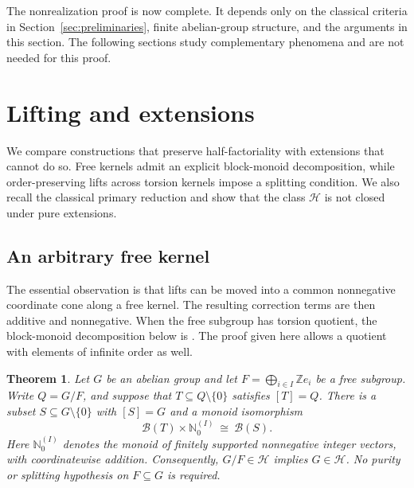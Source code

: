 \documentclass[11pt,reqno]{amsart}
\numberwithin{equation}{section}
\newtheorem{theorem}{Theorem}[section]
\theoremstyle{definition}
\theoremstyle{remark}
\newcommand{\Z}{\mathbb Z}
\newcommand{\Nzero}{\mathbb N_0}
\newcommand{\HF}{\mathcal H}
\newcommand{\B}{\mathcal B}
\begin{document}
The nonrealization proof is now complete. It depends only on the
classical criteria in Section~\ref{sec:preliminaries}, finite
abelian-group structure, and the arguments in this section. The
following sections study complementary phenomena and are not
needed for this proof.

\section{Lifting and extensions}\label{sec:extensions}

We compare constructions that preserve half-factoriality with
extensions that cannot do so. Free kernels admit an explicit
block-monoid decomposition, while order-preserving lifts across
torsion kernels impose a splitting condition. We also recall the
classical primary reduction and show that the class $\HF$ is not
closed under pure extensions.

\subsection{An arbitrary free kernel}

The essential observation is that lifts can be moved into a common
nonnegative coordinate cone along a free kernel. The resulting
correction terms are then additive and nonnegative. When the free
subgroup has torsion quotient, the block-monoid decomposition below
is \cite[Proposition~3.7]{GeroldingerGoebel}. The proof given here
allows a quotient with elements of infinite order as well.

\begin{theorem}\label{thm:lifting}
Let $G$ be an abelian group and let
$F=\bigoplus_{i\in I}\Z e_i$ be a free subgroup. Write
$Q=G/F$, and suppose that $T\subseteq Q\setminus\{0\}$ satisfies
$[T]=Q$. There is a subset $S\subseteq G\setminus\{0\}$ with
$[S]=G$ and a monoid isomorphism
\begin{equation}\label{eq:mainiso}
 \B(T)\times\Nzero^{(I)}\ \cong\ \B(S).
\end{equation}
Here $\Nzero^{(I)}$ denotes the monoid of finitely supported
nonnegative integer vectors, with coordinatewise addition.
Consequently, $G/F\in\HF$ implies $G\in\HF$. No purity or
splitting hypothesis on $F\subseteq G$ is required.
\end{theorem}
\end{document}
